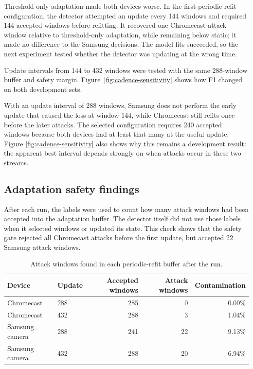 




Threshold-only adaptation made both devices worse. In the first periodic-refit
configuration, the detector attempted an update every 144 windows and required
144 accepted windows before refitting. It recovered one Chromecast attack
window relative to threshold-only adaptation, while remaining below static;
it made no difference to the Samsung decisions. The model fits
succeeded, so the next experiment tested whether the detector was updating at
the wrong time.

Update intervals from 144 to 432 windows were tested with the same 288-window
buffer and safety margin. Figure~\ref{fig:cadence-sensitivity} shows how F1
changed on both development sets.



With an update interval of 288 windows, Samsung does not perform the early update
that caused the loss at window 144, while Chromecast still refits once before
the later attacks. The selected configuration requires 240 accepted windows
because both devices had at least that many at the useful update. Figure
\ref{fig:cadence-sensitivity} also shows why this remains a development result:
the apparent best interval depends strongly on when attacks occur in these two
streams.

\subsection{Adaptation safety findings}

After each run, the labels were used to count how many attack windows had been
accepted into the adaptation buffer. The detector itself did not use those
labels when it selected windows or updated its state. This check shows that the
safety gate rejected all Chromecast attacks before the first update, but
accepted 22 Samsung attack windows.

\begin{table}[H]
\centering
\small
\begin{tabular}{llrrr}
\toprule
\textbf{Device} & \textbf{Update} & \textbf{Accepted windows} &
\textbf{Attack windows} & \textbf{Contamination} \\
\midrule
Chromecast & 288 & 285 & 0 & 0.00\% \\
Chromecast & 432 & 288 & 3 & 1.04\% \\
Samsung camera & 288 & 241 & 22 & 9.13\% \\
Samsung camera & 432 & 288 & 20 & 6.94\% \\
\bottomrule
\end{tabular}
\caption{Attack windows found in each periodic-refit buffer after the run.}
\label{tab:safe-contamination}
\end{table}

